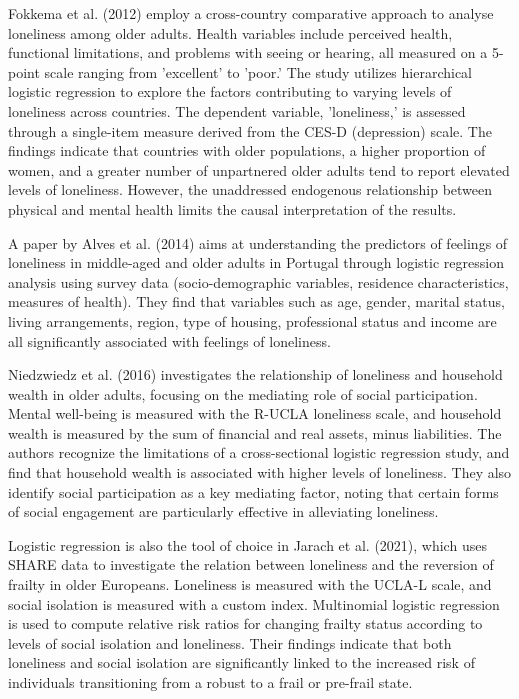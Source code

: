     Fokkema et al. (2012) employ a cross-country comparative approach to analyse loneliness among older adults. Health variables include perceived health, functional limitations, and problems with seeing or hearing, all measured on a 5-point scale ranging from 'excellent' to 'poor.' The study utilizes hierarchical logistic regression to explore the factors contributing to varying levels of loneliness across countries. The dependent variable, 'loneliness,' is assessed through a single-item measure derived from the CES-D (depression) scale.
    The findings indicate that countries with older populations, a higher proportion of women, and a greater number of unpartnered older adults tend to report elevated levels of loneliness. However, the unaddressed endogenous relationship between physical and mental health limits the causal interpretation of the results.

    A paper by Alves et al. (2014) aims at understanding the predictors of feelings of loneliness in middle-aged and older adults in Portugal through logistic regression analysis using survey data (socio-demographic variables, residence characteristics, measures of health). They find that variables such as age, gender, marital status, living arrangements, region, type of housing, professional status and income are all significantly associated with feelings of loneliness. 

    Niedzwiedz et al. (2016) investigates the relationship of loneliness and household wealth in older adults, focusing on the mediating role of social participation. Mental well-being is measured with the R-UCLA loneliness scale, and household wealth is measured by the sum of financial and real assets, minus liabilities. The authors recognize the limitations of a cross-sectional logistic regression study, and find that household wealth is associated with higher levels of loneliness. They also identify social participation as a key mediating factor, noting that certain forms of social engagement are particularly effective in alleviating loneliness.

    Logistic regression is also the tool of choice in Jarach et al. (2021), which uses SHARE data to investigate the relation between loneliness and the reversion of frailty in older Europeans. Loneliness is measured with the UCLA-L scale, and social isolation is measured with a custom index. 
    Multinomial logistic regression is used to compute relative risk ratios for changing frailty status according to levels of social isolation and loneliness. Their findings indicate that both loneliness and social isolation are significantly linked to the increased risk of individuals transitioning from a robust to a frail or pre-frail state.

